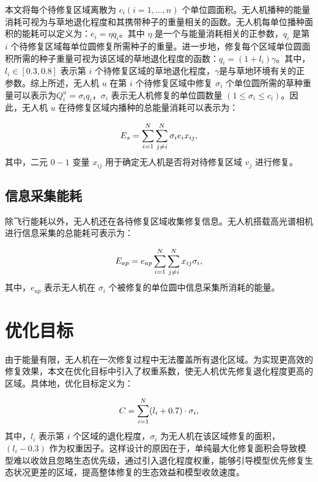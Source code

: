 \documentclass[AutoFakeBold]{LZUThesis}
\begin{document}
本文将每个待修复区域离散为 $c_i(i = 1, ..., n)$ 个单位圆面积。无人机播种的能量消耗可视为与草地退化程度和其携带种子的重量相关的函数。无人机每单位播种面积的能耗可以定义为：$e_i = \eta q_i$。其中 $\eta$ 是一个与能量消耗相关的正参数，$q_i$ 是第 $i$ 个待修复区域每单位圆修复所需种子的重量。进一步地，修复每个区域单位圆面积所需的种子重量可视为该区域的草地退化程度的函数\cite{klaus2017enriching}：$q_i = (1 + l_i) \gamma$。其中，$l_i \in [0.3, 0.8]$ 表示第 $i$ 个待修复区域的草地退化程度，$\gamma$是与草地环境有关的正参数。综上所述，无人机 $u$ 在第 $i$ 个待修复区域中修复 $\sigma_i$ 个单位圆所需的草种重量可以表示为$Q^u_i = \sigma_i q_i$，$\sigma_i$ 表示无人机修复的单位圆数量 $(1\leq\sigma_i\leq c_i)$。因此，无人机 $u$ 在待修复区域内播种的总能量消耗可以表示为：

\begin{equation} \label{seeding-energy}
	\begin{small}
		E_s = \sum^N_{i = 1}\sum^N_{j \neq i}\sigma_i e_i x_{ij},
	\end{small}
\end{equation}
其中，二元 $0-1$ 变量 $x_{ij}$ 用于确定无人机是否将对待修复区域 $v_j$ 进行修复。

\subsection{信息采集能耗}

除飞行能耗以外，无人机还在各待修复区域收集修复信息。无人机搭载高光谱相机进行信息采集的总能耗可表示为：

\begin{equation} \label{hyper-spectral-camera-energy}
	\begin{scriptsize}
		E_{ap} = e_{ap}\sum^N_{i=1}\sum^N_{j \neq i} x_{ij}\sigma_i,
	\end{scriptsize}
\end{equation}
其中，$e_{ap}$ 表示无人机在 $\sigma_i$ 个被修复的单位圆中信息采集所消耗的能量。

\section{优化目标}

由于能量有限，无人机在一次修复过程中无法覆盖所有退化区域。为实现更高效的修复效果，本文在优化目标中引入了权重系数，使无人机优先修复退化程度更高的区域。具体地，优化目标定义为：

\begin{equation} \label{maximize-weighted-sum}
	\begin{small}
		C = \sum_{i=1}^{N} (l_i + 0.7) \cdot \sigma_i,
	\end{small}
\end{equation}
其中，$l_i$ 表示第 $i$ 个区域的退化程度，$\sigma_i$ 为无人机在该区域修复的面积，$(l_i - 0.3)$ 作为权重因子。这样设计的原因在于，单纯最大化修复面积会导致模型难以收敛且忽略生态优先级，通过引入退化程度权重，能够引导模型优先修复生态状况更差的区域，提高整体修复的生态效益和模型收敛速度。
\end{document}

